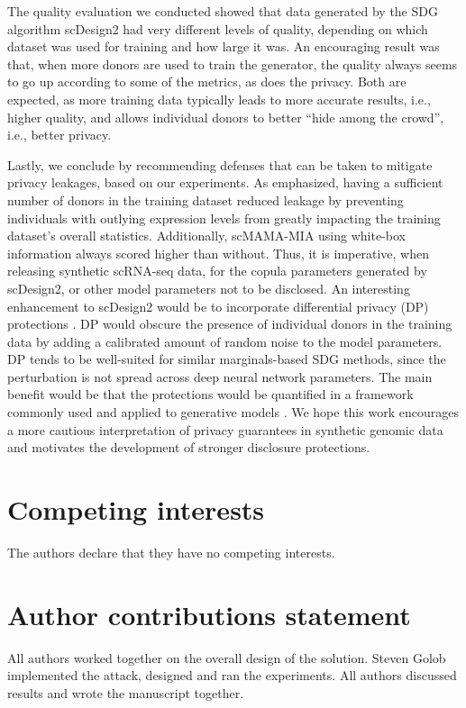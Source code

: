 \documentclass[unnumsec,webpdf,contemporary,large]{oup-authoring-template}%
\theoremstyle{thmstyleone}%
\theoremstyle{thmstyletwo}%
\theoremstyle{thmstylethree}%
\begin{document}
The quality evaluation we conducted showed that data generated by the SDG algorithm scDesign2 had very different levels of quality, depending on which dataset was used for training and how large it was. An encouraging result was that, when more donors are used to train the generator, the quality always seems to go up according to some of the metrics, as does the privacy. Both are expected, as more training data typically leads to more accurate results, i.e., higher quality, and allows individual donors to better ``hide among the crowd'', i.e., better privacy. 

Lastly, we conclude by recommending defenses that can be taken to mitigate privacy leakages, based on our experiments. As emphasized, having a sufficient number of donors in the training dataset reduced leakage by preventing individuals with outlying expression levels from greatly impacting the training dataset's overall statistics. Additionally, scMAMA-MIA using white-box information always scored higher than without. Thus, it is imperative, when releasing synthetic scRNA-seq data, for the copula parameters generated by scDesign2, or other model parameters not to be disclosed. An interesting enhancement to scDesign2 would be to incorporate differential privacy (DP) protections \cite{dwork2014algorithmic}. DP would obscure the presence of individual donors in the training data by adding a calibrated amount of random noise to the model parameters. DP tends to be well-suited for similar marginals-based SDG methods, since the perturbation is not spread across deep neural network parameters. The main benefit would be that the protections would be quantified in a framework commonly used and applied to generative models \cite{abadi_deep_2016_manual,chaudhuri2011differentially}. We hope this work encourages a more cautious interpretation of privacy guarantees in synthetic genomic data and motivates the development of stronger disclosure protections.


\section{Competing interests}
The authors declare that they have no competing interests.

\section{Author contributions statement}
All authors worked together on the overall design of the solution. Steven Golob implemented the attack, designed and ran the experiments. All authors discussed results and wrote the manuscript together. 
\end{document}

